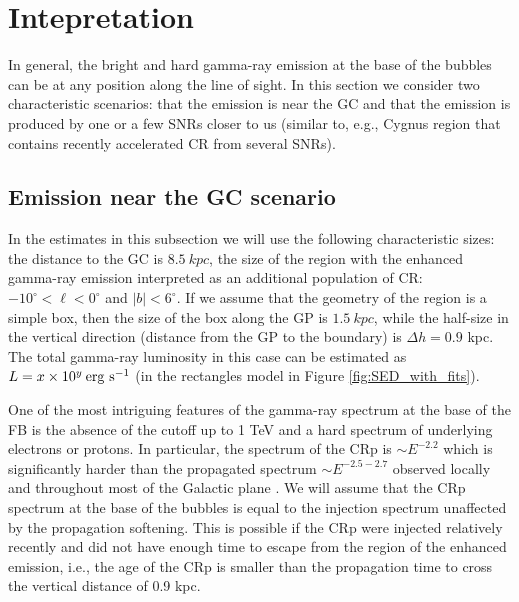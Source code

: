 \section{Intepretation}
\label{sec:Interpretation}

In general, the bright and hard gamma-ray emission at the base of the bubbles can be at any position along the line of sight.
In this section we consider two characteristic scenarios: that the emission is near the GC and that the emission is 
produced by one or a few SNRs closer to us (similar to, e.g., Cygnus region that contains recently accelerated CR from several SNRs).

\subsection{Emission near the GC scenario}

In the estimates in this subsection we will use the following characteristic sizes: 
the distance to the GC is $\SI{8.5}{kpc}$, 
the size of the region with the enhanced gamma-ray emission interpreted as an additional population of CR:
$-10^\circ < \ell < 0^\circ$ and $|b| < 6^\circ$.
If we assume that the geometry of the region is a simple box, then the size of the box along the GP is $\SI{1.5}{kpc}$,
while the half-size in the vertical direction (distance from the GP to the boundary) is $\Delta h = 0.9$ kpc.
The total gamma-ray luminosity in this case can be estimated as $L = x \times 10^{y}\:{\rm erg\ s^{-1}}$
(in the rectangles model in Figure \ref{fig:SED_with_fits}).

One of the most intriguing features of the gamma-ray spectrum at the base of the FB is the absence of the cutoff up to 1 TeV and 
a hard spectrum of underlying electrons or protons.
In particular, the spectrum of the CRp is $\sim E^{-2.2}$ which is significantly harder than the propagated spectrum
$\sim E^{-2.5 - 2.7}$ observed locally and throughout most of the Galactic plane \citep{2016ApJS..223...26A}.
We will assume that the CRp spectrum at the base of the bubbles is equal to the injection spectrum unaffected by the 
propagation softening.
This is possible if the CRp were injected relatively recently and did not have enough time to escape from the region of the enhanced emission,
i.e., the age of the CRp is smaller than the propagation time to cross the vertical distance of 0.9 kpc.

